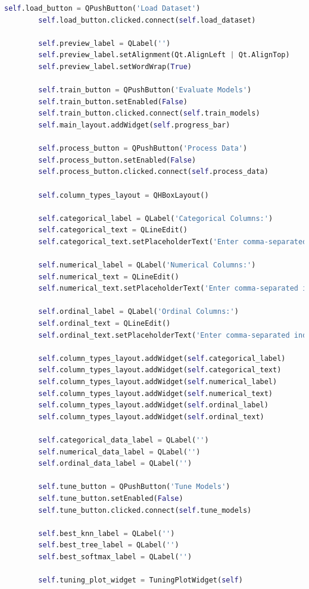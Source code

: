 \documentclass[letterpaper,10pt]{article}
\begin{document}
\begin{lstlisting}[language=Python, caption=ui.py - Final structure after refactoring. ]
        self.load_button = QPushButton('Load Dataset')
        self.load_button.clicked.connect(self.load_dataset)

        self.preview_label = QLabel('')
        self.preview_label.setAlignment(Qt.AlignLeft | Qt.AlignTop)
        self.preview_label.setWordWrap(True)

        self.train_button = QPushButton('Evaluate Models')
        self.train_button.setEnabled(False)
        self.train_button.clicked.connect(self.train_models)
        self.main_layout.addWidget(self.progress_bar)

        self.process_button = QPushButton('Process Data')
        self.process_button.setEnabled(False)
        self.process_button.clicked.connect(self.process_data)

        self.column_types_layout = QHBoxLayout()
    
        self.categorical_label = QLabel('Categorical Columns:')
        self.categorical_text = QLineEdit()
        self.categorical_text.setPlaceholderText('Enter comma-separated indices')
        
        self.numerical_label = QLabel('Numerical Columns:')
        self.numerical_text = QLineEdit()
        self.numerical_text.setPlaceholderText('Enter comma-separated indices')
        
        self.ordinal_label = QLabel('Ordinal Columns:')
        self.ordinal_text = QLineEdit()
        self.ordinal_text.setPlaceholderText('Enter comma-separated indices')
        
        self.column_types_layout.addWidget(self.categorical_label)
        self.column_types_layout.addWidget(self.categorical_text)
        self.column_types_layout.addWidget(self.numerical_label)
        self.column_types_layout.addWidget(self.numerical_text)
        self.column_types_layout.addWidget(self.ordinal_label)
        self.column_types_layout.addWidget(self.ordinal_text)

        self.categorical_data_label = QLabel('')
        self.numerical_data_label = QLabel('')
        self.ordinal_data_label = QLabel('')  

        self.tune_button = QPushButton('Tune Models')
        self.tune_button.setEnabled(False)
        self.tune_button.clicked.connect(self.tune_models)

        self.best_knn_label = QLabel('')
        self.best_tree_label = QLabel('')
        self.best_softmax_label = QLabel('')
        
        self.tuning_plot_widget = TuningPlotWidget(self)



\end{lstlisting}
\end{document}
